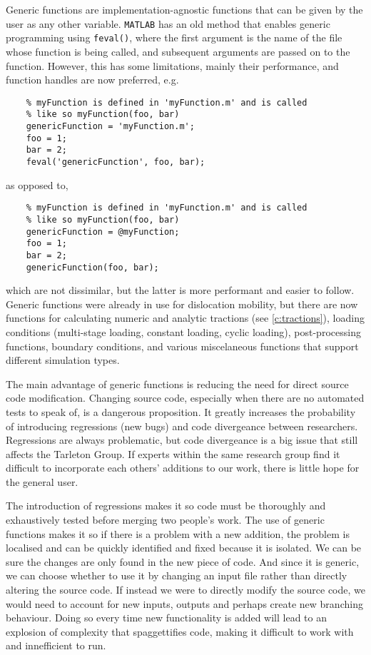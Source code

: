 Generic functions are implementation-agnostic functions that can be given by the user as any other variable. \texttt{MATLAB} has an old method that enables generic programming using \texttt{feval()}, where the first argument is the name of the file whose function is being called, and subsequent arguments are passed on to the function. However, this has some limitations, mainly their performance, and function handles are now preferred, e.g.
\begin{verbatim}
    % myFunction is defined in 'myFunction.m' and is called 
    % like so myFunction(foo, bar)
    genericFunction = 'myFunction.m'; 
    foo = 1;
    bar = 2;
    feval('genericFunction', foo, bar);
\end{verbatim}
as opposed to,
\begin{verbatim}
    % myFunction is defined in 'myFunction.m' and is called 
    % like so myFunction(foo, bar)
    genericFunction = @myFunction; 
    foo = 1;
    bar = 2;
    genericFunction(foo, bar);
\end{verbatim}
which are not dissimilar, but the latter is more performant and easier to follow. Generic functions were already in use for dislocation mobility, but there are now functions for calculating numeric and analytic tractions (see \cref{c:tractions}), loading conditions (multi-stage loading, constant loading, cyclic loading), post-processing functions, boundary conditions, and various miscelaneous functions that support different simulation types.

The main advantage of generic functions is reducing the need for direct source code modification. Changing source code, especially when there are no automated tests to speak of, is a dangerous proposition. It greatly increases the probability of introducing regressions (new bugs) and code divergeance between researchers. Regressions are always problematic, but code divergeance is a big issue that still affects the Tarleton Group. If experts within the same research group find it difficult to incorporate each others' additions to our work, there is little hope for the general user.

The introduction of regressions makes it so code must be thoroughly and exhaustively tested before merging two people's work. The use of generic functions makes it so if there is a problem with a new addition, the problem is localised and can be quickly identified and fixed because it is isolated. We can be sure the changes are only found in the new piece of code. And since it is generic, we can choose whether to use it by changing an input file rather than directly altering the source code. If instead we were to directly modify the source code, we would need to account for new inputs, outputs and perhaps create new branching behaviour. Doing so every time new functionality is added will lead to an explosion of complexity that spaggettifies code, making it difficult to work with and innefficient to run.

